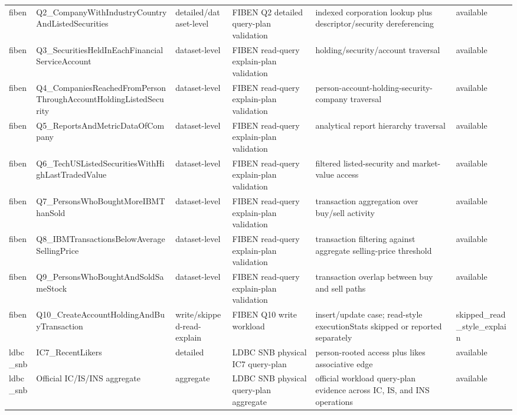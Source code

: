 \begin{longtable}{llllll}
fiben & Q2\_CompanyWithIndustryCountryAndListedSecurities & detailed/dataset-level & FIBEN Q2 detailed query-plan validation & indexed corporation lookup plus descriptor/security dereferencing & available \\
fiben & Q3\_SecuritiesHeldInEachFinancialServiceAccount & dataset-level & FIBEN read-query explain-plan validation & holding/security/account traversal & available \\
fiben & Q4\_CompaniesReachedFromPersonThroughAccountHoldingListedSecurity & dataset-level & FIBEN read-query explain-plan validation & person-account-holding-security-company traversal & available \\
fiben & Q5\_ReportsAndMetricDataOfCompany & dataset-level & FIBEN read-query explain-plan validation & analytical report hierarchy traversal & available \\
fiben & Q6\_TechUSListedSecuritiesWithHighLastTradedValue & dataset-level & FIBEN read-query explain-plan validation & filtered listed-security and market-value access & available \\
fiben & Q7\_PersonsWhoBoughtMoreIBMThanSold & dataset-level & FIBEN read-query explain-plan validation & transaction aggregation over buy/sell activity & available \\
fiben & Q8\_IBMTransactionsBelowAverageSellingPrice & dataset-level & FIBEN read-query explain-plan validation & transaction filtering against aggregate selling-price threshold & available \\
fiben & Q9\_PersonsWhoBoughtAndSoldSameStock & dataset-level & FIBEN read-query explain-plan validation & transaction overlap between buy and sell paths & available \\
fiben & Q10\_CreateAccountHoldingAndBuyTransaction & write/skipped-read-explain & FIBEN Q10 write workload & insert/update case; read-style executionStats skipped or reported separately & skipped\_read\_style\_explain \\
ldbc\_snb & IC7\_RecentLikers & detailed & LDBC SNB physical IC7 query-plan & person-rooted access plus likes associative edge & available \\
ldbc\_snb & Official IC/IS/INS aggregate & aggregate & LDBC SNB physical query-plan aggregate & official workload query-plan evidence across IC, IS, and INS operations & available \\
\bottomrule
\end{longtable}